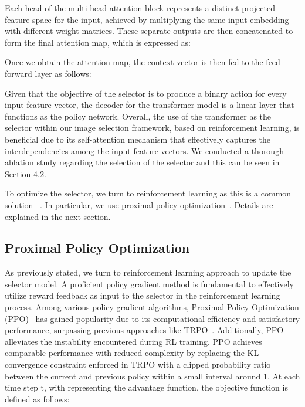 \documentclass[10pt,twocolumn,letterpaper]{article}
\begin{document}
Each head of the multi-head attention block represents a distinct projected feature space for the input, achieved by multiplying the same input embedding with different weight matrices. These separate outputs are then concatenated to form the final attention map, which is expressed as:





Once we obtain the attention map, the context vector is then fed to the feed-forward layer as follows:


Given that the objective of the selector is to produce a binary action for every input feature vector, the decoder for the transformer model is a linear layer that functions as the policy network. Overall, the use of the transformer as the selector within our image selection framework, based on reinforcement learning, is beneficial due to its self-attention mechanism that effectively captures the interdependencies among the input feature vectors. We conducted a thorough ablation study regarding the selection of the selector and this can be seen in Section 4.2.

To optimize the selector, we turn to reinforcement learning as this is a common solution ~\cite{yoon2020data,L2A}. In particular, we use proximal policy optimization~\cite{ppo}. Details are explained in the next section.

\subsection{Proximal Policy Optimization}

As previously stated, we turn to reinforcement learning approach to update the selector model. A proficient policy gradient method is fundamental to effectively utilize reward feedback as input to the selector in the reinforcement learning process. Among various policy gradient algorithms, Proximal Policy Optimization (PPO)~\cite{ppo} has gained popularity due to its computational efficiency and satisfactory performance, surpassing previous approaches like TRPO~\cite{trpo}. Additionally, PPO alleviates the instability encountered during RL training. PPO achieves comparable performance with reduced complexity by replacing the KL convergence constraint enforced in TRPO with a clipped probability ratio between the current and previous policy within a small interval around 1. At each time step t, with  representing the advantage function, the objective function is defined as follows:
\end{document}
